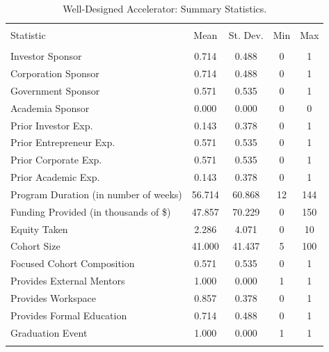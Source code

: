 \documentclass[
  12pt,
]{article}
\begin{document}
\begin{minipage}{0.45\textwidth}

\begin{table}[H] \centering 
  \caption{Well-Designed Accelerator: Summary Statistics.} 
  \label{tab:welldesigneddf} 
\tiny 
\begin{tabular}{@{\extracolsep{1pt}}lcccc} 
\\[-1.8ex]\hline 
\hline \\[-1.8ex] 
Statistic & \multicolumn{1}{c}{Mean} & \multicolumn{1}{c}{St. Dev.} & \multicolumn{1}{c}{Min} & \multicolumn{1}{c}{Max} \\ 
\hline \\[-1.8ex] 
Investor Sponsor & 0.714 & 0.488 & 0 & 1 \\ 
Corporation Sponsor & 0.714 & 0.488 & 0 & 1 \\ 
Government Sponsor & 0.571 & 0.535 & 0 & 1 \\ 
Academia Sponsor & 0.000 & 0.000 & 0 & 0 \\ 
Prior Investor Exp. & 0.143 & 0.378 & 0 & 1 \\ 
Prior Entrepreneur Exp. & 0.571 & 0.535 & 0 & 1 \\ 
Prior Corporate Exp. & 0.571 & 0.535 & 0 & 1 \\ 
Prior Academic Exp. & 0.143 & 0.378 & 0 & 1 \\ 
Program Duration (in number of weeks) & 56.714 & 60.868 & 12 & 144 \\ 
Funding Provided (in thousands of \$) & 47.857 & 70.229 & 0 & 150 \\ 
Equity Taken & 2.286 & 4.071 & 0 & 10 \\ 
Cohort Size & 41.000 & 41.437 & 5 & 100 \\ 
Focused Cohort Composition & 0.571 & 0.535 & 0 & 1 \\ 
Provides External Mentors & 1.000 & 0.000 & 1 & 1 \\ 
Provides Workspace & 0.857 & 0.378 & 0 & 1 \\ 
Provides Formal Education & 0.714 & 0.488 & 0 & 1 \\ 
Graduation Event & 1.000 & 0.000 & 1 & 1 \\ 
\hline \\[-1.8ex] 
\end{tabular} 
\end{table} 
\end{minipage}

~

~
\end{document}
